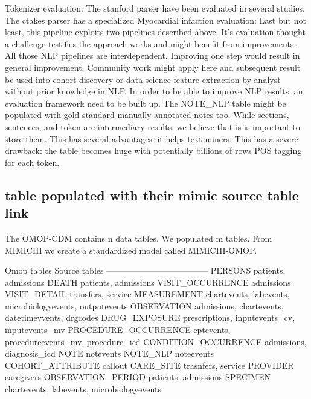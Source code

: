 Tokenizer evaluation: The stanford parser have been evaluated in several
studies. The ctakes parser has a specialized Myocardial infaction
evaluation: Last but not least, this pipeline exploits two pipelines
described above. It's evaluation thought a challenge testifies the
approach works and might benefit from improvements. All those NLP
pipelines are interdependent. Improving one step would result in general
improvement. Community work might apply here and subsequent result be
used into cohort discovery or data-science feature extraction by analyst
without prior knowledge in NLP. In order to be able to improve NLP
results, an evaluation framework need to be built up. The NOTE\_NLP
table might be populated with gold standard manually annotated notes
too. While sections, sentences, and token are intermediary results, we
believe that is is important to store them. This has several advantages:
it helps text-miners. This has a severe drawback: the table becomes huge
with potentially billions of rows POS tagging for each token.

\subsection{table populated with their mimic source table
link}\label{table-populated-with-their-mimic-source-table-link}

The OMOP-CDM contains n data tables. We populated m tables. From
MIMICIII we create a standardized model called MIMICIII-OMOP.

\textbar{} Omop tables \textbar{} Source tables\textbar{}
\textbar{}-----------------------\textbar{}--------------\textbar{}
\textbar{} PERSONS \textbar{} patients, admissions \textbar{} \textbar{}
DEATH \textbar{} patients, admissions \textbar{} \textbar{}
VISIT\_OCCURRENCE \textbar{} admissions \textbar{} \textbar{}
VISIT\_DETAIL \textbar{} transfers, service \textbar{} \textbar{}
MEASUREMENT \textbar{} chartevents, labevents, microbiologyevents,
outputevents \textbar{} \textbar{} OBSERVATION \textbar{} admissions,
chartevents, datetimevvents, drgcodes \textbar{} \textbar{}
DRUG\_EXPOSURE \textbar{} prescriptions, inputevents\_cv,
inputevents\_mv\textbar{} \textbar{} PROCEDURE\_OCCURRENCE \textbar{}
cptevents, procedureevents\_mv, procedure\_icd\textbar{} \textbar{}
CONDITION\_OCCURRENCE \textbar{} admissions, diagnosis\_icd \textbar{}
\textbar{} NOTE \textbar{} notevents\textbar{} \textbar{} NOTE\_NLP
\textbar{} noteevents \textbar{} \textbar{} COHORT\_ATTRIBUTE \textbar{}
callout \textbar{} \textbar{} CARE\_SITE \textbar{} trasnfers, service
\textbar{} \textbar{} PROVIDER \textbar{} caregivers \textbar{}
\textbar{} OBSERVATION\_PERIOD \textbar{} patients, admissions
\textbar{} \textbar{} SPECIMEN \textbar{} chartevents, labevents,
microbiologyevents \textbar{}

